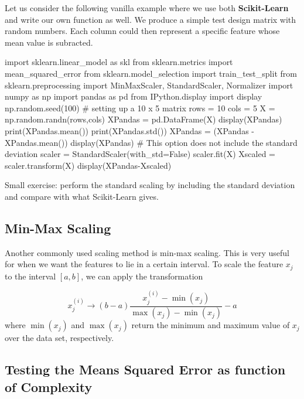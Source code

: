 \documentclass[%
oneside,                 %
final,                   %
10pt]{article}
\begin{document}
Let us consider the following vanilla example where we use both
\textbf{Scikit-Learn} and write our own function as well.  We produce a
simple test design matrix with random numbers. Each column could then
represent a specific feature whose mean value is subracted.

























\bpycod
import sklearn.linear_model as skl
from sklearn.metrics import mean_squared_error
from sklearn.model_selection import  train_test_split
from sklearn.preprocessing import MinMaxScaler, StandardScaler, Normalizer
import numpy as np
import pandas as pd
from IPython.display import display
np.random.seed(100)
# setting up a 10 x 5 matrix
rows = 10
cols = 5
X = np.random.randn(rows,cols)
XPandas = pd.DataFrame(X)
display(XPandas)
print(XPandas.mean())
print(XPandas.std())
XPandas = (XPandas -XPandas.mean())
display(XPandas)
#  This option does not include the standard deviation
scaler = StandardScaler(with_std=False)
scaler.fit(X)
Xscaled = scaler.transform(X)
display(XPandas-Xscaled)

\epycod


Small exercise: perform the standard scaling by including the standard deviation and compare with what Scikit-Learn gives.

\subsection{Min-Max Scaling}

Another commonly used scaling method is min-max scaling. This is very
useful for when we want the features to lie in a certain interval. To
scale the feature $x_j$ to the interval $[a, b]$, we can apply the
transformation

\[
x_j^{(i)} \rightarrow (b-a)\frac{x_j^{(i)} - \min(x_j)}{\max(x_j) - \min(x_j)} - a
\]
where $\min(x_j)$ and $\max(x_j)$ return the minimum and maximum value of $x_j$ over the data set, respectively.

\subsection{Testing the Means Squared Error as function of Complexity}
\end{document}
